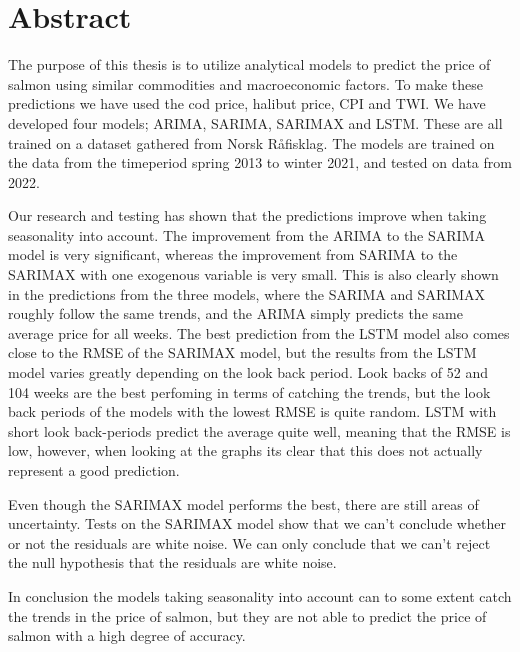 \section*{Abstract}
The purpose of this thesis is to utilize analytical models to predict the price of salmon using similar commodities and macroeconomic factors. To make these predictions we have used the cod price, halibut price, CPI and TWI. We have developed four models; ARIMA, SARIMA, SARIMAX and LSTM. These are all trained on a dataset gathered from Norsk Råfisklag. The models are trained on the data from the timeperiod spring 2013 to winter 2021, and tested on data from 2022. 

Our research and testing has shown that the predictions improve when taking seasonality into account. The improvement from the ARIMA to the SARIMA model is very significant, whereas the improvement from SARIMA to the SARIMAX with one exogenous variable is very small. This is also clearly shown in the predictions from the three models, where the SARIMA and SARIMAX roughly follow the same trends, and the ARIMA simply predicts the same average price for all weeks. The best prediction from the LSTM model also comes close to the RMSE of the SARIMAX model, but the results from the LSTM model varies greatly depending on the look back period. Look backs of 52 and 104 weeks are the best perfoming in terms of catching the trends, but the look back periods of the models with the lowest RMSE is quite random. LSTM with short look back-periods predict the average quite well, meaning that the RMSE is low, however, when looking at the graphs its clear that this does not actually represent a good prediction. 

Even though the SARIMAX model performs the best, there are still areas of uncertainty. Tests on the SARIMAX model show that we can't conclude whether or not the residuals are white noise. We can only conclude that we can't reject the null hypothesis that the residuals are white noise.  

In conclusion the models taking seasonality into account can to some extent catch the trends in the price of salmon, but they are not able to predict the price of salmon with a high degree of accuracy. 